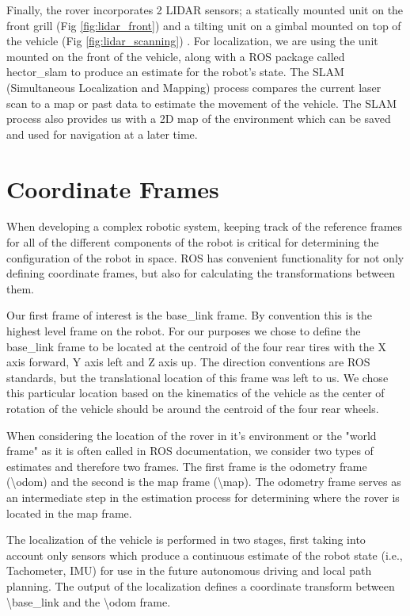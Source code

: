 Finally, the rover incorporates 2 LIDAR sensors; a statically mounted unit on the front grill (Fig \ref{fig:lidar_front}) and a tilting unit on a gimbal mounted on top of the vehicle (Fig \ref{fig:lidar_scanning}) . For localization, we are using the unit mounted on the front of the vehicle, along with a ROS package called hector\_slam to produce an estimate for the robot's state. The SLAM (Simultaneous Localization and Mapping) process compares the current laser scan to a map or past data to estimate the movement of the vehicle. The SLAM process also provides us with a 2D map of the environment which can be saved and used for navigation at a later time.

\section{Coordinate Frames}

When developing a complex robotic system, keeping track of the reference frames for all of the different components of the robot is critical for determining the configuration of the robot in space. ROS has convenient functionality for not only defining coordinate frames, but also for calculating the transformations between them. 

Our first frame of interest is the base\_link frame. By convention this is the highest level frame on the robot. For our purposes we chose to define the base\_link frame to be located at the centroid of the four rear tires with the X axis forward, Y axis left and Z axis up. The direction conventions are ROS standards, but the translational location of this frame was left to us. We chose this particular location based on the kinematics of the vehicle as the center of rotation of the vehicle should be around the centroid of the four rear wheels. 

When considering the location of the rover in it's environment or the "world frame" as it is often called in ROS documentation, we consider two types of estimates and therefore two frames. The first frame is the odometry frame (\textbackslash odom) and the second is the map frame (\textbackslash map). The odometry frame serves as an intermediate step in the estimation process for determining where the rover is located in the map frame.

The localization of the vehicle is performed in two stages, first taking into account only sensors which produce a continuous estimate of the robot state (i.e., Tachometer, IMU) for use in the future autonomous driving and local path planning. The output of the localization defines a coordinate transform between \textbackslash base\_link and the \textbackslash odom frame.

